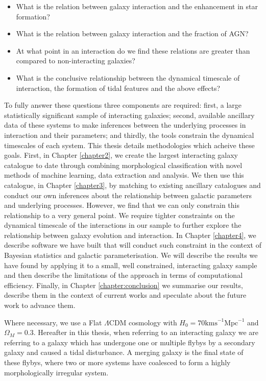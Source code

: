\begin{itemize}
\item What is the relation between galaxy interaction and the enhancement in star formation?
\item What is the relation between galaxy interaction and the fraction of AGN?
\item At what point in an interaction do we find these relations are greater than compared to non-interacting galaxies?
\item What is the conclusive relationship between the dynamical timescale of interaction, the formation of tidal features and the above effects?
\end{itemize}

To fully answer these questions three components are required: first, a large statistically significant sample of interacting galaxies; second, available ancillary data of these systems to make inferences between the underlying processes in interaction and their parameters; and thirdly, the tools constrain the dynamical timescales of each system. This thesis details methodologies which acheive these goals. First, in Chapter \ref{chapter2}, we create the largest interacting galaxy catalogue to date through combining morphological classification with novel methods of machine learning, data extraction and analysis. We then use this catalogue, in Chapter \ref{chapter3}, by matching to existing ancillary catalogues and conduct our own inferences about the relationship between galactic parameters and underlying processes. However, we find that we can only constrain this relationship to a very general point. We require tighter constraints on the dynamical timescale of the interactions in our sample to further explore the relationship between galaxy evolution and interaction. In Chapter \ref{chapter4}, we describe software we have built that will conduct such constraint in the context of Bayesian statistics and galactic parameterisation. We will describe the results we have found by applying it to a small, well constrained, interacting galaxy sample and then describe the limitations of the approach in terms of computational efficiency. Finally, in Chapter \ref{chapter:conclusion} we summarise our results, describe them in the context of current works and speculate about the future work to advance them.

Where necessary, we use a Flat $\Lambda$CDM cosmology with $H_{0} = 70\mathrm{kms}^{-1}\mathrm{Mpc}^{-1}$ and $\Omega_{M} = 0.3$. Hereafter in this thesis, when referring to an interacting galaxy we are referring to a galaxy which has undergone one or multiple flybys by a secondary galaxy and caused a tidal disturbance. A merging galaxy is the final state of these flybys, where two or more systems have coalesced to form a highly morphologically irregular system.
